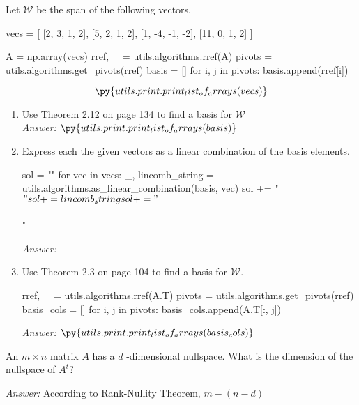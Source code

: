 \documentclass[letterpaper]{article}
\newcommand{\ans}{\textit{Answer: }}
\newenvironment{question}[2][Question]{\begin{trivlist}
\item[\hskip \labelsep {\bfseries #1}\hskip \labelsep {\bfseries #2.}]}{\end{trivlist}}
\begin{document}
\begin{question}{2.70}
    Let $\mathcal { W }$ be the span of the following vectors.

\begin{pycode}
vecs = [
    [2, 3, 1, 2],
    [5, 2, 1, 2],
    [1, -4, -1, -2],
    [11, 0, 1, 2]
]

A = np.array(vecs)
rref, _ = utils.algorithms.rref(A)
pivots = utils.algorithms.get_pivots(rref)
basis = []
for i, j in pivots:
    basis.append(rref[i])
\end{pycode}

$$\py{utils.print.print_list_of_arrays(vecs)}$$

    \begin{enumerate}[label=(\alph*)]
        \item Use Theorem 2.12 on page 134 to find a basis for $\mathcal { W }$ \\
        \ans $\py{utils.print.print_list_of_arrays(basis)}$

        \item Express each the given vectors as a linear combination of the 
        basis elements. \\
\begin{pycode}
sol = ""
for vec in vecs:
    _, lincomb_string = utils.algorithms.as_linear_combination(basis, vec)
    sol += "$"
    sol += lincomb_string
    sol += "$ \\\\"
\end{pycode}
        \ans {}

        \item Use Theorem 2.3 on page 104 to find a basis for $\mathcal { W }$. \\
\begin{pycode}
rref, _ = utils.algorithms.rref(A.T)
pivots = utils.algorithms.get_pivots(rref)
basis_cols = []
for i, j in pivots:
    basis_cols.append(A.T[:, j])
\end{pycode}
        \ans $\py{utils.print.print_list_of_arrays(basis_cols)}$
    \end{enumerate}
\end{question}

\begin{question}{2.80}
    An $m \times n$ matrix $A$ has a $d$ -dimensional nullspace. What is the 
    dimension of the nullspace of $A ^ { t } ?$

    \ans According to Rank-Nullity Theorem, $m - (n - d)$
\end{question}
\end{document}
